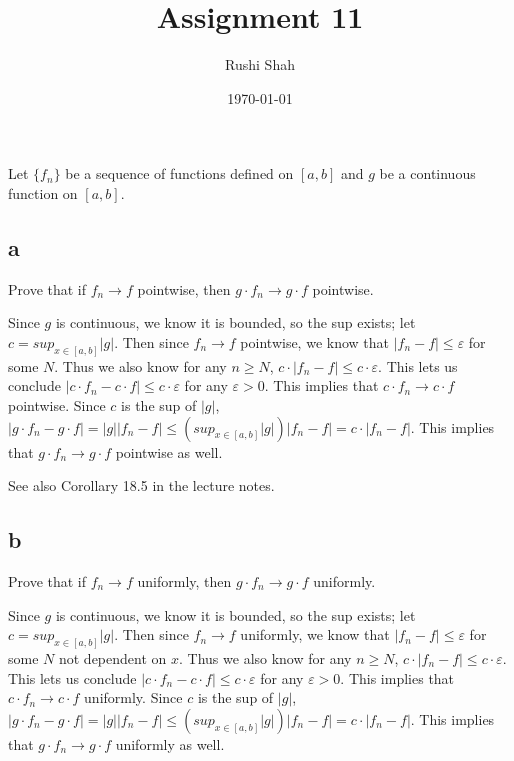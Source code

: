 \documentclass[]{article}
\author{Rushi Shah}
\date{\today}
\title{Assignment 11}
\begin{document}
	\maketitle

	\section{}
		\begin{em}
			Let $\{f_n\}$ be a sequence of functions defined on $[a, b]$ and $g$ be a continuous function on $[a, b]$. 
		\end{em}

		\subsection*{a}
		\begin{em}
			Prove that if $f_n \to f$ pointwise, then $g \cdot f_n \to g \cdot f$ pointwise. 
		\end{em}

			Since $g$ is continuous, we know it is bounded, so the sup exists; let $c = sup_{x \in [a, b]}|g|$. Then since $f_n \to f$ pointwise, we know that $|f_n - f| \leq \varepsilon$ for some $N$. Thus we also know for any $n \geq N$, $c \cdot |f_n - f| \leq c \cdot \varepsilon$. This lets us conclude $|c \cdot f_n - c \cdot f| \leq c \cdot \varepsilon$ for any $\varepsilon > 0$. This implies that $c \cdot f_n \to c \cdot f$ pointwise. Since $c$ is the sup of $|g|$, $|g \cdot f_n - g \cdot f| = |g||f_n -f| \leq (sup_{x \in [a,b]} |g|)|f_n - f| = c \cdot |f_n - f|$. This implies that $g \cdot f_n \to g \cdot f$ pointwise as well.


			See also Corollary 18.5 in the lecture notes. 

		\subsection*{b}
			\begin{em}
				Prove that if $f_n \to f$ uniformly, then $g \cdot f_n \to g \cdot f$ uniformly.
			\end{em}

			Since $g$ is continuous, we know it is bounded, so the sup exists; let $c = sup_{x \in [a, b]}|g|$. Then since $f_n \to f$ uniformly, we know that $|f_n - f| \leq \varepsilon$ for some $N$ not dependent on $x$. Thus we also know for any $n \geq N$, $c \cdot |f_n - f| \leq c \cdot \varepsilon$. This lets us conclude $|c \cdot f_n - c \cdot f| \leq c \cdot \varepsilon$ for any $\varepsilon > 0$. This implies that $c \cdot f_n \to c \cdot f$ uniformly. Since $c$ is the sup of $|g|$, $|g \cdot f_n - g \cdot f| = |g||f_n -f| \leq (sup_{x \in [a,b]} |g|)|f_n - f| = c \cdot |f_n - f|$. This implies that $g \cdot f_n \to g \cdot f$ uniformly as well.
\end{document}

